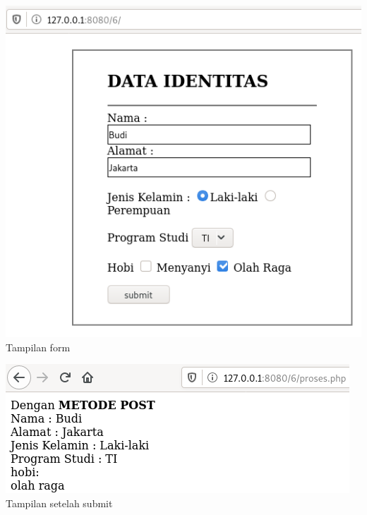 \documentclass[a4paper,12pt]{article}
\begin{document}
\begin{minipage}{\linewidth}
    \centering
    \includegraphics[scale=.5]{index.png}\\
    \caption{Tampilan form}
\end{minipage}
\begin{minipage}{\linewidth}
    \centering
    \includegraphics[scale=.6]{post.png}\\
    \caption{Tampilan setelah submit}
\end{minipage}
\end{document}
